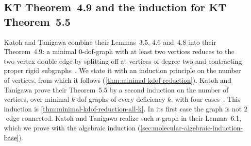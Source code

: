 \subsection{KT Theorem~4.9 and the induction for KT Theorem~5.5}
\label{sec:molecular-induction-thm49}

Katoh and Tanigawa combine their Lemmas~3.5, 4.6 and~4.8 into their
Theorem~4.9: a minimal $0$-dof-graph with at least two vertices reduces
to the two-vertex double edge by splitting off at vertices of degree two
and contracting proper rigid
subgraphs~\cite[pp.~666--667]{katohTanigawa2011}. We state it with an
induction principle on the number of vertices, from which it follows
(\cref{thm:minimal-kdof-reduction}). Katoh and Tanigawa prove their
Theorem~5.5 by a second induction on the number of vertices, over
minimal $k$-dof-graphs of every deficiency $k$, with four
cases~\cite[p.~671]{katohTanigawa2011}. This induction is
\cref{thm:minimal-kdof-reduction-all-k}. In its first case the graph is
not $2$-edge-connected. Katoh and Tanigawa realize such a graph in their
Lemma~6.1, which we prove with the algebraic induction
(\cref{sec:molecular-algebraic-induction-base}).

